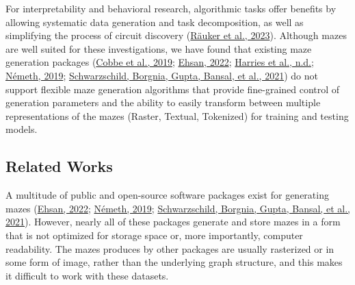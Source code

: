 \documentclass[10pt,a4paper,onecolumn]{article}
\begin{document}
For interpretability and behavioral research, algorithmic tasks offer
benefits by allowing systematic data generation and task decomposition,
as well as simplifying the process of circuit discovery
(\protect\hyperlink{ref-interpretability-survery}{Räuker et al., 2023}).
Although mazes are well suited for these investigations, we have found
that existing maze generation packages
(\protect\hyperlink{ref-cobbe2019procgen}{Cobbe et al., 2019};
\protect\hyperlink{ref-gh_Ehsan_2022}{Ehsan, 2022};
\protect\hyperlink{ref-harriesMazeExplorerCustomisable3D2019}{Harries et
al., n.d.}; \protect\hyperlink{ref-gh_Nemeth_2019}{Németh, 2019};
\protect\hyperlink{ref-easy_to_hard}{Schwarzschild, Borgnia, Gupta,
Bansal, et al., 2021}) do not support flexible maze generation
algorithms that provide fine-grained control of generation parameters
and the ability to easily transform between multiple representations of
the mazes (Raster, Textual, Tokenized) for training and testing models.

\hypertarget{related-works}{%
\subsection{Related Works}\label{related-works}}

A multitude of public and open-source software packages exist for
generating mazes (\protect\hyperlink{ref-gh_Ehsan_2022}{Ehsan, 2022};
\protect\hyperlink{ref-gh_Nemeth_2019}{Németh, 2019};
\protect\hyperlink{ref-easy_to_hard}{Schwarzschild, Borgnia, Gupta,
Bansal, et al., 2021}). However, nearly all of these packages generate
and store mazes in a form that is not optimized for storage space or,
more importantly, computer readability. The mazes produces by other
packages are usually rasterized or in some form of image, rather than
the underlying graph structure, and this makes it difficult to work with
these datasets.
\end{document}
